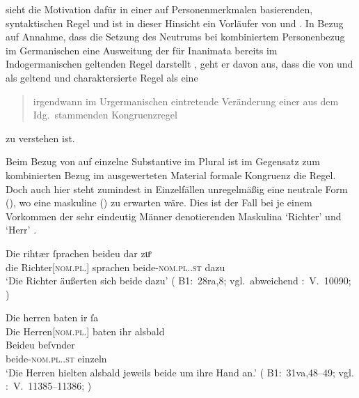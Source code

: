 \citet{askedal1973} sieht die Motivation dafür in einer auf Personenmerkmalen
basierenden, syntaktischen Regel und ist in dieser Hinsicht ein Vorläufer von
\citet{corbett1983} und \citet{wechslerzlatic2003}. In Bezug auf
 Annahme, dass die Setzung des Neutrums bei
kombiniertem Personenbezug im Germanischen eine Ausweitung der
für Inanimata bereits im Indogermanischen geltenden Regel
darstellt \autocite[vgl.~auch][156--157]{hock2008}, geht er davon aus, dass die
von \citet[28]{behaghel1928} und \citet[188]{dal2014} als  geltend und  charaktersierte Regel als eine
\blockcquote[15]{askedal1973}{irgendwann im Urgermanischen
eintretende\textdel{} Veränderung einer aus dem Idg.\ stammenden
Kongruenzregel} zu verstehen ist.

Beim Bezug von  auf einzelne Substantive im Plural ist im Gegensatz
zum kombinierten Bezug im ausgewerteten Material formale Kongruenz die Regel.
Doch auch hier steht zumindest in Einzelfällen unregelmäßig eine
neutrale Form (), wo eine maskuline () zu erwarten
wäre. Dies ist der Fall bei je einem Vorkommen der sehr eindeutig Männer
denotierenden Maskulina  `Richter' und  `Herr'
.

\begin{exe}
\ex \label{ex:richtherriu3}
	\begin{xlist}
	\ex \gll Die rihtær ſprachen beideu {dar zuͦ} \\
			die Richter[\textsc{nom.pl.\MascM}] sprachen
				beide-\textsc{nom.pl.\NeutM.st} dazu \\
		\trans `Die Richter äußerten sich beide dazu'
			(%
				B1:~28ra,8; vgl.~abweichend
				\KC:~V.~10090;
				\cite[267]{schroeder1895}%
			)
		\label{ex:richtherriu3_1}

	\ex \gll Die herren baten ir ſa \\
			Die Herren[\textsc{nom.pl.\MascM}] baten ihr alsbald \\
	\sn \gll Beideu beſvnder \\
			beide-\textsc{nom.pl.\NeutM.st} einzeln \\
		\trans `Die Herren hielten alsbald jeweils beide um ihre Hand an.'
			(%
				B1:~31va,48--49; vgl.
				\KC:~V.~11385--11386;
				\cite[289]{schroeder1895}%
			)
		\label{ex:richtherriu3_2}
	\end{xlist}
\end{exe}

